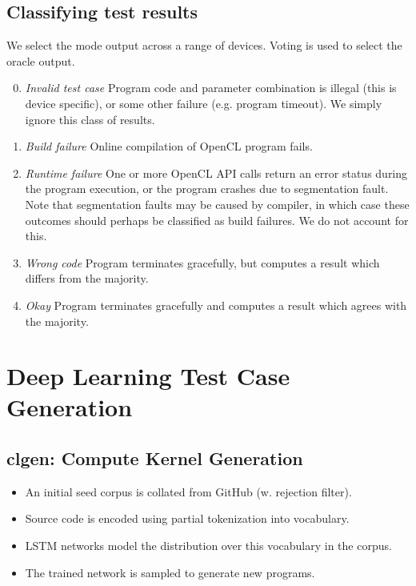 \subsection{Classifying test results}

We select the mode output across a range of devices. Voting is used to select the oracle output.
%
\begin{enumerate}
\setcounter{enumi}{-1}
\item \emph{Invalid test case} Program code and parameter combination is illegal (this is device specific), or some other failure (e.g. program timeout). We simply ignore this class of results.
\item \emph{Build failure} Online compilation of OpenCL program fails.
\item \emph{Runtime failure} One or more OpenCL API calls return an error status during the program execution, or the program crashes due to segmentation fault. Note that segmentation faults may be caused by compiler, in which case these outcomes should perhaps be classified as build failures. We do not account for this.
\item \emph{Wrong code} Program terminates gracefully, but computes a result which differs from the majority.
\item \emph{Okay} Program terminates gracefully and computes a result which agrees with the majority.
\end{enumerate}


\section{Deep Learning Test Case Generation}

\subsection{clgen: Compute Kernel Generation}

\begin{itemize}
\item An initial seed corpus is collated from GitHub (w. rejection filter).
\item Source code is encoded using partial tokenization into vocabulary.
\item LSTM networks model the distribution over this vocabulary in the corpus.
\item The trained network is sampled to generate new programs.
\end{itemize}

